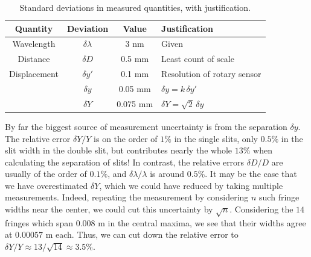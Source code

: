 \documentclass[11pt]{article}
\begin{document}
        \begin{table}[H]
                \centering
                \caption{Standard deviations in measured quantities, with justification.}
                \label{tab:deviations}
                \begin{tabular}{c|c|c|l}\hline
                Quantity        & Deviation             & Value         & Justification         \\\hline\hline
                Wavelength      & $\delta\lambda$       & 3 nm          & Given                 \\
                Distance        & $\delta D$            & 0.5 mm        & Least count of scale  \\
                Displacement    & $\delta y'$           & 0.1 mm        & Resolution of rotary sensor \\
                                & $\delta y$            & 0.05 mm       & $\delta y = k\, \delta y'$ \\
                                & $\delta Y$            & 0.075 mm      & $\delta Y = \sqrt{2}\, \delta y$ \\\hline
                \end{tabular}
        \end{table}
        
        By far the biggest source of measurement uncertainty is from the separation $\delta y$. The relative error $\delta Y / Y$ is
        on the order of $1\%$ in the single slits, only $0.5\%$ in the slit width in the double slit, but contributes nearly the whole $13\%$
        when calculating the separation of slits! In contrast, the relative errors $\delta D / D$ are usually of the order of $0.1\%$, 
        and $\delta\lambda / \lambda$ is around $0.5\%$. It may be the case that we have overestimated $\delta Y$, which we could have
        reduced by taking multiple measurements. Indeed, repeating the measurement by considering $n$ such fringe widths near the center,
        we could cut this uncertainty by $\sqrt{n}$. Considering the $14$ fringes which span $0.008$ m in the central maxima, we see that their widths 
        agree at $0.00057$ m each. Thus, we can cut down the relative error to $\delta Y / Y \approx 13 / \sqrt{14} \approx 3.5\%$.
\end{document}
